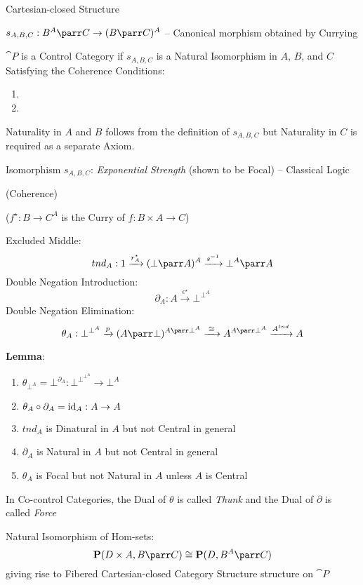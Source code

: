 Cartesian-closed Structure

$s_{A,B,C} : B^A \parr C \rightarrow (B \parr C)^A$ -- Canonical
morphism obtained by Currying %

$\cat{P}$ is a Control Category if $s_{A,B,C}$ is a Natural
Isomorphism in $A$, $B$, and $C$ Satisfying the Coherence Conditions:
\begin{enumerate}
  \item
  \item
\end{enumerate}

\fist Naturality in $A$ and $B$ follows from the definition of
$s_{A,B,C}$ but Naturality in $C$ is required as a separate Axiom.

Isomorphism $s_{A,B,C}$: \emph{Exponential Strength} (shown to be
Focal) -- Classical Logic

(Coherence) %

($f^\star : B \rightarrow C^A$ is the Curry of $f : B \times A
\rightarrow C$)

Excluded Middle:
\[
  tnd_A : 1 \xrightarrow{r^\star_A} (\bot \parr A)^A
  \xrightarrow{s^{-1}} \bot^A \parr A
\]
Double Negation Introduction:
\[
  \partial_A : A \xrightarrow{\epsilon^\star} \bot^{\bot^A}
\]
Double Negation Elimination:
\[
  \theta_A : \bot^{\bot^A} \xrightarrow{p} (A \parr
  \bot)^{A\parr\bot^A} \xrightarrow{\;\cong\;} A^{A\parr\bot^A}
  \xrightarrow{A^{tnd}} A
\]

\textbf{Lemma}:
\begin{enumerate}
  \item $\theta_{\bot^A} = \bot^{\partial_A} : \bot^{\bot^{\bot^A}}
    \rightarrow \bot^A$
  \item $\theta_A \circ \partial_A = \mathrm{id}_A : A \rightarrow A$
  \item $tnd_A$ is Dinatural in $A$ but not Central in general
  \item $\partial_A$ is Natural in $A$ but not Central in general
  \item $\theta_A$ is Focal but not Natural in $A$ unless $A$ is
    Central %
\end{enumerate}

In Co-control Categories, the Dual of $\theta$ is called \emph{Thunk}
and the Dual of $\partial$ is called \emph{Force}

Natural Isomorphism of Hom-sets:
\[
  \cat{P}(D \times A, B \parr C) \cong \cat{P}(D,B^A \parr C)
\]
giving rise to Fibered Cartesian-closed Category Structure structure
on $\cat{P}$

